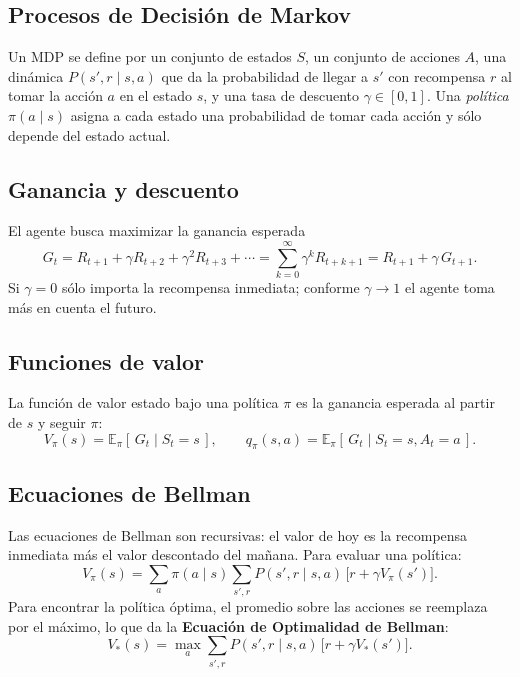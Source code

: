 \documentclass[11pt,letterpaper]{article}
\begin{document}
\subsection{Procesos de Decisión de Markov}
Un MDP se define por un conjunto de estados $S$, un conjunto de acciones $A$, una dinámica $P(s', r \mid s, a)$ que da la probabilidad de llegar a $s'$ con recompensa $r$ al tomar la acción $a$ en el estado $s$, y una tasa de descuento $\gamma \in [0,1]$. Una \emph{política} $\pi(a \mid s)$ asigna a cada estado una probabilidad de tomar cada acción y sólo depende del estado actual.

\subsection{Ganancia y descuento}
El agente busca maximizar la ganancia esperada
\begin{equation}
G_t = R_{t+1} + \gamma R_{t+2} + \gamma^2 R_{t+3} + \cdots = \sum_{k=0}^{\infty} \gamma^k R_{t+k+1} = R_{t+1} + \gamma\, G_{t+1}.
\end{equation}
Si $\gamma = 0$ sólo importa la recompensa inmediata; conforme $\gamma \to 1$ el agente toma más en cuenta el futuro.

\subsection{Funciones de valor}
La función de valor estado bajo una política $\pi$ es la ganancia esperada al partir de $s$ y seguir $\pi$:
\begin{equation}
V_\pi(s) = \mathbb{E}_\pi\left[\, G_t \mid S_t = s \,\right], \qquad q_\pi(s,a) = \mathbb{E}_\pi\left[\, G_t \mid S_t = s, A_t = a \,\right].
\end{equation}

\subsection{Ecuaciones de Bellman}
Las ecuaciones de Bellman son recursivas: el valor de hoy es la recompensa inmediata más el valor descontado del mañana. Para evaluar una política:
\begin{equation}
V_\pi(s) = \sum_a \pi(a\mid s) \sum_{s',r} P(s',r \mid s,a)\,\big[r + \gamma V_\pi(s')\big].
\end{equation}
Para encontrar la política óptima, el promedio sobre las acciones se reemplaza por el máximo, lo que da la \textbf{Ecuación de Optimalidad de Bellman}:
\begin{equation}
\label{eq:optimalidad}
V_*(s) = \max_a \sum_{s',r} P(s',r \mid s,a)\,\big[r + \gamma V_*(s')\big].
\end{equation}
\end{document}
